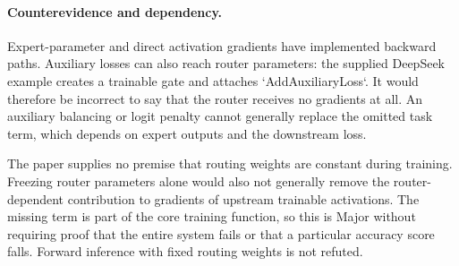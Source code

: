 \documentclass[10pt]{article}
\begin{document}
\paragraph*{Counterevidence and dependency.}\mbox{}\par
Expert-parameter and direct activation gradients have implemented backward paths. Auxiliary losses can also reach router parameters: the supplied DeepSeek example creates a trainable gate and attaches `AddAuxiliaryLoss`. It would therefore be incorrect to say that the router receives no gradients at all. An auxiliary balancing or logit penalty cannot generally replace the omitted task term, which depends on expert outputs and the downstream loss.\par
The paper supplies no premise that routing weights are constant during training. Freezing router parameters alone would also not generally remove the router-dependent contribution to gradients of upstream trainable activations. The missing term is part of the core training function, so this is Major without requiring proof that the entire system fails or that a particular accuracy score falls. Forward inference with fixed routing weights is not refuted.\par
\end{document}
